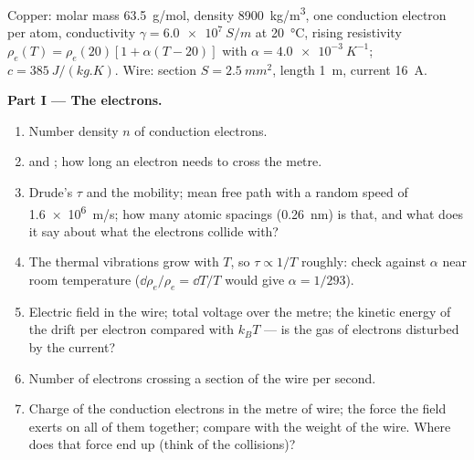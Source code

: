 \begin{problem}
\label{pb:b2:charges-currents-conduction:1}

Copper: molar mass \qty{63.5}{g/mol}, density \qty{8900}{kg/m^3}, one
conduction electron per atom, conductivity $\gamma = \qty{6.0e7}{S/m}$ at
\qty{20}{\degreeCelsius}, rising resistivity $\rho_e(T) = \rho_e(20)[1 +
\alpha(T - 20)]$ with $\alpha = \qty{4.0e-3}{K^{-1}}$; $c = \qty{385}{J/(kg.K)}$. Wire:
section $S = \qty{2.5}{mm^2}$, length \qty{1}{m}, current \qty{16}{A}.

\medskip
\noindent\textbf{Part I --- The electrons.}
\begin{enumerate}
  \item Number density $n$ of conduction electrons.
  \item {} and ; how long an electron needs
        to cross the metre.
  \item Drude's $\tau$ and the mobility; mean free path with a random
        speed of \qty{1.6e6}{m/s}; how many atomic spacings (\qty{0.26}{nm})
        is that, and what does it say about what the electrons collide
        with?
  \item The thermal vibrations grow with $T$, so $\tau \propto 1/T$ roughly:
        check against $\alpha$ near room temperature ($\dd\rho_e/\rho_e =
        \dd T/T$ would give $\alpha = 1/293$).
  \item Electric field in the wire; total voltage over the metre; the
        kinetic energy of the drift per electron compared with $k_BT$ ---
        is the gas of electrons disturbed by the current?
  \item Number of electrons crossing a section of the wire per second.
  \item Charge of the conduction electrons in the metre of wire; the
        force the field exerts on all of them together; compare with
        the weight of the wire. Where does that force end up (think
        of the collisions)?
\end{enumerate}


\end{problem}
